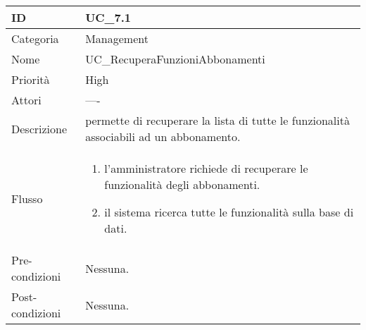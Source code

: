 \begin{center}
\begin{tabular}{ |p{2cm}|p{13cm}|  }
\hline
ID & UC\_7.1 \\\hline
Categoria & Management\\\hline
Nome & UC\_RecuperaFunzioniAbbonamenti\\\hline
Priorità & High \\\hline
Attori &  ---- \\\hline
Descrizione & permette di recuperare la lista di tutte le funzionalità associabili ad un abbonamento.\\\hline
Flusso &  	\begin{enumerate}
			\item l'amministratore richiede di recuperare le funzionalità degli abbonamenti.
			\item il sistema ricerca tutte le funzionalità sulla base di dati.
		\end{enumerate}\\\hline
Pre-condizioni &  Nessuna.\\\hline
Post-condizioni &  Nessuna.\\\hline
\end{tabular}
\label{table_use_case:7.1}\newline

\end{center}